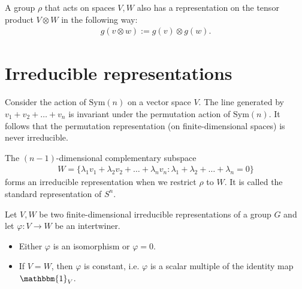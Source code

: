     \begin{example}
        A group $\rho$ that acts on spaces $V, W$ also has a representation on the tensor product  $V\otimes W$ in the following way:
        \begin{gather}
            g(v\otimes w) := g(v)\otimes g(w).
        \end{gather}
    \end{example}


\section{Irreducible representations}


    \begin{example}
        Consider the action of $\text{Sym}(n)$ on a vector space $V$. The line generated by $v_1+v_2+\ldots+v_n$ is invariant under the permutation action of $\text{Sym}(n)$. It follows that the permutation representation (on finite-dimensional spaces) is never irreducible.

        The $(n-1)$-dimensional complementary subspace
        \begin{gather}
            W = \{\lambda_1v_1 + \lambda_2v_2 + \ldots + \lambda_nv_n:\lambda_1 + \lambda_2 + \ldots + \lambda_n = 0\}
        \end{gather}
        forms an irreducible representation when we restrict $\rho$ to $W$. It is called the standard representation of $S^n$.
    \end{example}

    \begin{theorem}\label{rep:schurs_lemma}
        Let $V, W$ be two finite-dimensional irreducible representations of a group $G$ and let $\varphi:V\rightarrow W$ be an intertwiner.
        \begin{itemize}
            \item Either $\varphi$ is an isomorphism or $\varphi=0$.
            \item If $V=W$, then $\varphi$ is constant, i.e. $\varphi$ is a scalar multiple of the identity map $\mathbbm{1}_V$.
        \end{itemize}
    \end{theorem}

